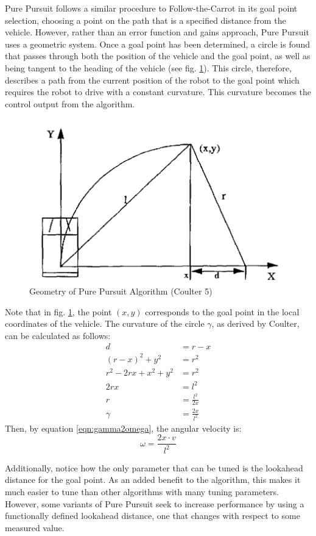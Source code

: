 \documentclass[mla7]{mla}
\begin{document}
\begin{paper}
Pure Pursuit follows a similar procedure to Follow-the-Carrot in its goal point selection, choosing a point on the path that is a specified distance from the vehicle. However, rather than an error function and gains approach, Pure Pursuit uses a geometric system. Once a goal point has been determined, a circle is found that passes through both the position of the vehicle and the goal point, as well as being tangent to the heading of the vehicle (see fig. \ref{img:pp1}). This circle, therefore, describes a path from the current position of the robot to the goal point which requires the robot to drive with a constant curvature. This curvature becomes the control output from the algorithm.

\begin{figure}[H]
\includegraphics[width=0.4\linewidth]{CoulterPurePursuitDiagram}
\captionsetup{justification=centering,margin=2cm}
\caption{Geometry of Pure Pursuit Algorithm (Coulter 5)}
\label{img:pp1}
\end{figure}

Note that in fig. \ref{img:pp1}, the point $(x,y)$ corresponds to the goal point in the local coordinates of the vehicle. The curvature of the circle $\gamma$, as derived by Coulter, can be calculated as follows:
\begin{subequations}
\begin{align}
d&=r-x \\
(r-x)^2+y^2&=r^2 \\
r^2-2rx+x^2+y^2&=r^2 \\
2rx&=l^2 \\
r&=\frac{l^2}{2x} \\
\gamma &= \frac{2x}{l^2}
\end{align}
\end{subequations}
 Then, by equation \ref{eqn:gamma2omega}, the angular velocity is:
\begin{equation}
\omega = \frac{2x \cdot v}{l^2}
\end{equation}

Additionally, notice how the only parameter that can be tuned is the lookahead distance for the goal point. As an added benefit to the algorithm, this makes it much easier to tune than other algorithms with many tuning parameters. However, some variants of Pure Pursuit seek to increase performance by using a functionally defined lookahead distance, one that changes with respect to some measured value.


\end{paper}
\end{document}
